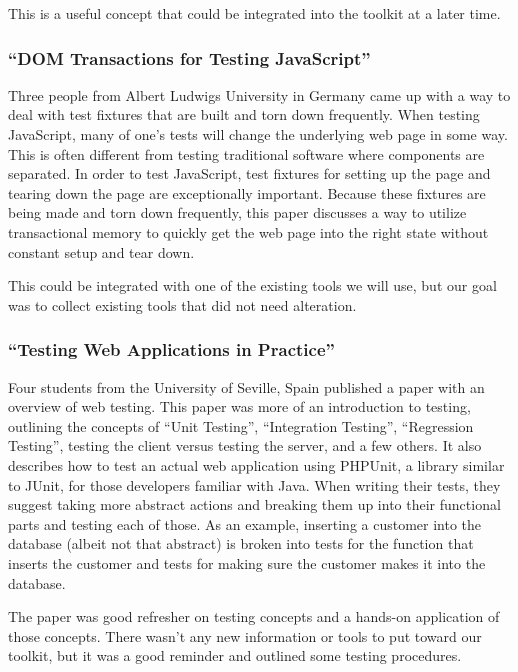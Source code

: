 \documentclass[11pt]{article}
\begin{document}
This is a useful concept that could be integrated into the toolkit at a later time.

\subsubsection{``DOM Transactions for Testing JavaScript'' \cite{DOMTransactions}}
Three people from Albert Ludwigs University in Germany came up with a way to deal with test fixtures that are built and torn down frequently. When testing JavaScript, many of one's tests will change the underlying web page in some way. This is often different from testing traditional software where components are separated. In order to test JavaScript, test fixtures for setting up the page and tearing down the page are exceptionally important. Because these fixtures are being made and torn down frequently, this paper discusses a way to utilize transactional memory to quickly get the web page into the right state without constant setup and tear down.

This could be integrated with one of the existing tools we will use, but our goal was to collect existing tools that did not need alteration.

\subsubsection{``Testing Web Applications in Practice'' \cite{TestingInPractice}}
Four students from the University of Seville, Spain published a paper with an overview of web testing. This paper was more of an introduction to testing, outlining the concepts of “Unit Testing”, “Integration Testing”, “Regression Testing”, testing the client versus testing the server, and a few others. It also describes how to test an actual web application using PHPUnit, a library similar to JUnit, for those developers familiar with Java. When writing their tests, they suggest taking more abstract actions and breaking them up into their functional parts and testing each of those. As an example, inserting a customer into the database (albeit not that abstract) is broken into tests for the function that inserts the customer and tests for making sure the customer makes it into the database.

The paper was good refresher on testing concepts and a hands-on application of those concepts. There wasn't any new information or tools to put toward our toolkit, but it was a good reminder and outlined some testing procedures.
\end{document}
